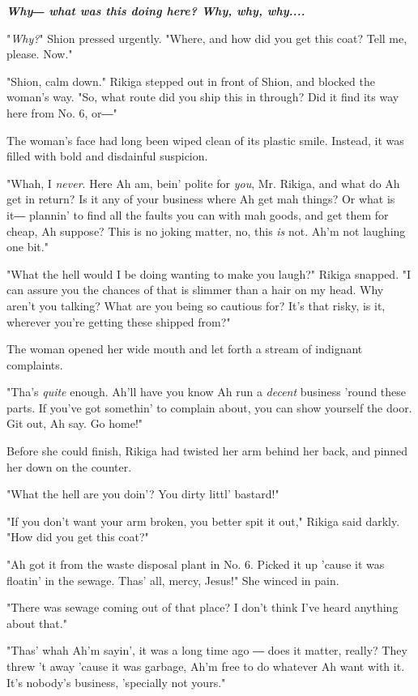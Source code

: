 \textbf{\emph{Why― what was this doing here? Why, why, why....}}

"\emph{Why?}" Shion pressed urgently. "Where, and how did you get this coat?
Tell me, please. Now."

"Shion, calm down." Rikiga stepped out in front of Shion, and blocked
the woman's way. "So, what route did you ship this in through? Did it
find its way here from No. 6, or―"

The woman's face had long been wiped clean of its plastic smile.
Instead, it was filled with bold and disdainful suspicion.

"Whah, I \emph{never}. Here Ah am, bein' polite for \emph{you}, Mr. Rikiga, and what
do Ah get in return? Is it any of your business where Ah get mah things?
Or what is it― plannin' to find all the faults you can with mah goods,
and get them for cheap, Ah suppose? This is no joking matter, no, this
\emph{is} not. Ah'm not laughing one bit."

"What the hell would I be doing wanting to make you laugh?" Rikiga
snapped. "I can assure you the chances of that is slimmer than a hair on
my head. Why aren't you talking? What are you being so cautious for?
It's that risky, is it, wherever you're getting these shipped from?"

The woman opened her wide mouth and let forth a stream of indignant
complaints.~

"Tha's \emph{quite} enough. Ah'll have you know Ah run a \emph{decent} business 'round
these parts. If you've got somethin' to complain about, you can show
yourself the door. Git out, Ah say. Go home!"

Before she could finish, Rikiga had twisted her arm behind her back, and
pinned her down on the counter.

"What the hell are you doin'? You dirty littl' bastard!"

"If you don't want your arm broken, you better spit it out," Rikiga said
darkly. "How did you get this coat?"

"Ah got it from the waste disposal plant in No. 6. Picked it up 'cause
it was floatin' in the sewage. Thas' all, mercy, Jesus!" She winced in
pain.

"There was sewage coming out of that place? I don't think I've heard
anything about that."

"Thas' whah Ah'm sayin', it was a long time ago ― does it matter,
really? They threw 't away 'cause it was garbage, Ah'm free to do
whatever Ah want with it. It's nobody's business, 'specially not yours."

